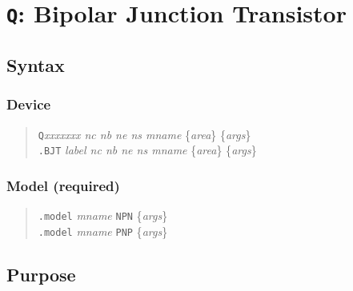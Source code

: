%
%
%
%
\section{{\tt Q}: Bipolar Junction Transistor}
\subsection{Syntax}
\subsubsection{Device}
\begin{verse}
{\tt Q}{\it xxxxxxx nc nb ne ns mname}
	\{{\it area}\} \{{\it args}\}\\
{\tt .BJT} {\it label nc nb ne ns mname}
	\{{\it area}\} \{{\it args}\}
\end{verse}
\subsubsection{Model (required)}
\begin{verse}
{\tt .model} {\it mname} {\tt NPN} \{{\it args}\} \\
{\tt .model} {\it mname} {\tt PNP} \{{\it args}\}
\end{verse}
\subsection{Purpose}

